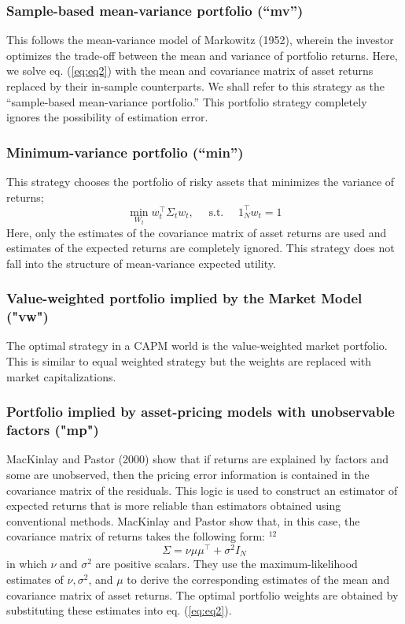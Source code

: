 \documentclass[11pt]{article}
\begin{document}
\subsubsection{Sample-based mean-variance portfolio (“mv”)}
This follows the mean-variance model of Markowitz (1952), wherein the investor optimizes the trade-off between
the mean and variance of portfolio returns. Here, we solve eq. (\ref{eq:eq2}) with the mean and covariance matrix
of asset returns replaced by their in-sample counterparts. We shall refer to
this strategy as the “sample-based mean-variance portfolio.” This portfolio strategy
completely ignores the possibility of estimation error.

\subsubsection{Minimum-variance portfolio (“min”)}
This strategy chooses the portfolio of risky assets that minimizes the variance of
returns; 
$$
\min _{W_{t}} w_{t}^{\top} \Sigma_{t} w_{t}, \quad \text { s.t. } \quad 1_{N}^{\top} w_{t}=1
$$
Here, only the estimates of the covariance matrix of asset returns are used and estimates of the expected returns are completely ignored. This strategy does not fall into the structure of mean-variance expected utility.

\subsubsection{Value-weighted portfolio implied by the Market Model ("vw")}
The optimal strategy in a CAPM world is the value-weighted market portfolio. This is similar to equal weighted strategy but the weights are replaced with market capitalizations.


\subsubsection{Portfolio implied by asset-pricing models with unobservable factors ("mp")}
MacKinlay and Pastor (2000) show that if returns are explained by factors and some are unobserved, then the pricing error information is contained in the covariance matrix of the residuals. This logic is used to construct an estimator of expected returns that is more reliable than estimators obtained using conventional methods. MacKinlay and Pastor show that, in this case, the covariance matrix of returns takes the following form: ${ }^{12}$
$$
\Sigma=\nu \mu \mu^{\top}+\sigma^{2} I_{N}
$$
in which $\nu$ and $\sigma^{2}$ are positive scalars. They use the maximum-likelihood estimates of $\nu, \sigma^{2}$, and $\mu$ to derive the corresponding estimates of the mean and covariance matrix of asset returns. The optimal portfolio weights are obtained by substituting these estimates into eq. (\ref{eq:eq2}).
\end{document}
